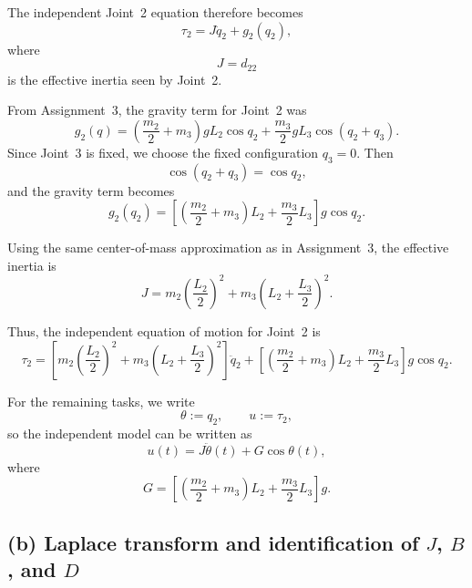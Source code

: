 \documentclass{article}
\begin{document}
The independent Joint~2 equation therefore becomes
\begin{equation}
    \tau_2 = J\ddot q_2 + g_2(q_2),
    \label{eq:joint2_independent}
\end{equation}
where
\begin{equation}
    J = d_{22}
\end{equation}
is the effective inertia seen by Joint~2.

From Assignment~3, the gravity term for Joint~2 was
\begin{equation}
    g_2(q)
    =
    \left(\frac{m_2}{2}+m_3\right)gL_2\cos q_2
    +
    \frac{m_3}{2}gL_3\cos(q_2+q_3).
\end{equation}
Since Joint~3 is fixed, we choose the fixed configuration $q_3=0$. Then
\[
    \cos(q_2+q_3)=\cos q_2,
\]
and the gravity term becomes
\begin{equation}
    g_2(q_2)
    =
    \left[
    \left(\frac{m_2}{2}+m_3\right)L_2
    +
    \frac{m_3}{2}L_3
    \right]g\cos q_2.
\end{equation}

Using the same center-of-mass approximation as in Assignment~3, the effective inertia is
\begin{equation}
    J
    =
    m_2\left(\frac{L_2}{2}\right)^2
    +
    m_3\left(L_2+\frac{L_3}{2}\right)^2.
\end{equation}

Thus, the independent equation of motion for Joint~2 is
\begin{equation}
    \boxed{
    \tau_2
    =
    \left[
    m_2\left(\frac{L_2}{2}\right)^2
    +
    m_3\left(L_2+\frac{L_3}{2}\right)^2
    \right]\ddot q_2
    +
    \left[
    \left(\frac{m_2}{2}+m_3\right)L_2
    +
    \frac{m_3}{2}L_3
    \right]g\cos q_2
    }.
\end{equation}

For the remaining tasks, we write
\[
    \theta := q_2,
    \qquad
    u := \tau_2,
\]
so the independent model can be written as
\begin{equation}
    u(t) = J\ddot\theta(t) + G\cos\theta(t),
\end{equation}
where
\[
    G =
    \left[
    \left(\frac{m_2}{2}+m_3\right)L_2
    +
    \frac{m_3}{2}L_3
    \right]g.
\]

\subsection*{(b) Laplace transform and identification of $J$, $B$, and $D$}
\end{document}
